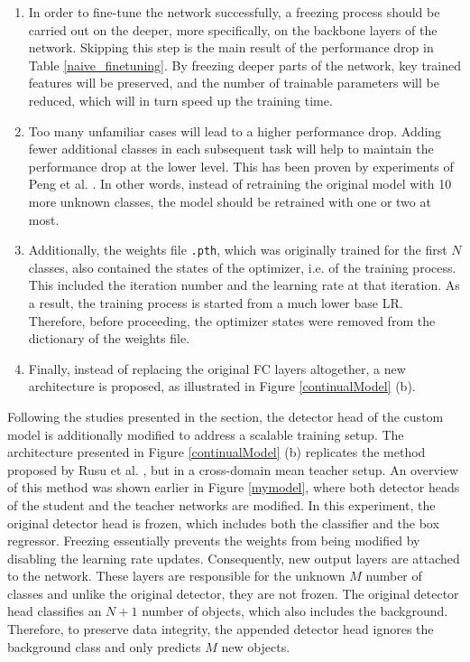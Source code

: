 \documentclass[english, 12pt, a4paper, elec, utf8, a-1b, online]{aaltothesis}
\begin{document}
\begin{enumerate}
\item In order to fine-tune the network successfully, a freezing process should be carried out on the deeper, more specifically, on the backbone layers of the network. Skipping this step is the main result of the performance drop in Table \ref{naive_finetuning}. By freezing deeper parts of the network, key trained features will be preserved, and the number of trainable parameters will be reduced, which will in turn speed up the training time. 
\item Too many unfamiliar cases will lead to a higher performance drop. Adding fewer additional classes in each subsequent task will help to maintain the performance drop at the lower level. This has been proven by experiments of Peng et al. \cite{Peng2020}. In other words, instead of retraining the original model with 10 more unknown classes, the model should be retrained with one or two at most. 
\item Additionally, the weights file \texttt{.pth}, which was originally trained for the first $N$ classes, also contained the states of the optimizer, i.e. of the training process. This included the iteration number and the learning rate at that iteration. As a result, the training process is started from a much lower base LR. Therefore, before proceeding, the optimizer states were removed from the dictionary of the weights file. 
\item Finally, instead of replacing the original FC layers altogether, a new architecture is proposed, as illustrated in Figure \ref{continualModel} (b). 
\end{enumerate}

Following the studies presented in the  section, the detector head of the custom model is additionally modified to address a scalable training setup. The architecture presented in Figure \ref{continualModel} (b) replicates the method proposed by Rusu et al. \cite{Rusu2016}, but in a cross-domain mean teacher setup. An overview of this method was shown earlier in Figure \ref{mymodel}, where both detector heads of the student and the teacher networks are modified. In this experiment, the original detector head is frozen, which includes both the classifier and the box regressor. Freezing essentially prevents the weights from being modified by disabling the learning rate updates. Consequently, new output layers are attached to the network. These layers are responsible for the unknown $M$ number of classes and unlike the original detector, they are not frozen. The original detector head classifies an $N+1$ number of objects, which also includes the background. Therefore, to preserve data integrity, the appended detector head ignores the background class and only predicts $M$ new objects. 
\end{document}
